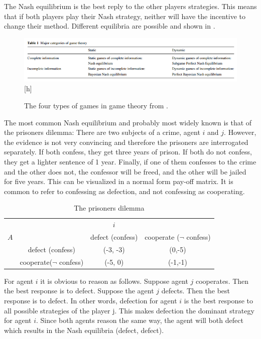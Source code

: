 The Nash equilibrium is the best reply to the other players strategies. This means that if both players play their Nash strategy, neither will have the incentive to change their method. Different equilibria are possible and shown in . 
\begin{figure}
	\centering
	\includegraphics[width=0.9\linewidth]{img/major_categories_of_game_theory}[h]
	\caption{The four types of games in game theory from \citet{trappey2013multi}.}
	\label{fig:majorcategoriesofgametheory}
\end{figure}
The most common Nash equilibrium and probably most widely known is that of the prisoners dilemma:
There are two subjects of a crime, agent $i$ and $j$. However, the evidence is not very convincing and therefore the prisoners are interrogated separately. If both confess, they get three years of prison. If both do not confess, they get a lighter sentence of 1 year. Finally, if one of them confesses to the crime and the other does not, the confessor will be freed, and the other will be jailed for five years.
This can be visualized in a normal form pay-off matrix. It is common to refer to confessing as defection, and not confessing as cooperating.
\begin{table}

\begin{tabular}{|c|c|c|c|}
	\hline 
		&  				& $i$ 			&  \\ 
	$A$ 	&				& defect (confess) 	& cooperate ($\neg$ confess) \\ 
		& defect (confess)	&  	(-3, -3)			& (0,-5) \\ 
		& cooperate($\neg $ confess) 	&  (-5, 0)				& (-1,-1) \\ 
	\hline 
\end{tabular} \label{tab:nashprison} \caption{The prisoners dilemma}
\end{table}
For agent $i$ it is obvious to reason as follows. Suppose agent $j$ cooperates. Then the best response is to defect. Suppose the agent $j$ defects. Then the best response is to defect. In other words, defection for agent $i$ is the best response to all possible strategies of the player j. This makes defection the dominant strategy for agent $i$. Since both agents reason the same way, the agent will both defect which results in the Nash equilibria (defect, defect).

